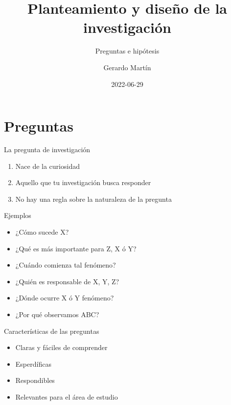 \documentclass[
  11pt,
  ignorenonframetext,
]{beamer}
\title{Planteamiento y diseño de la investigación}
\subtitle{Preguntas e hipótesis}
\author{Gerardo Martín}
\date{2022-06-29}
\begin{document}
\frame{\titlepage}

\hypertarget{preguntas}{%
\section{Preguntas}\label{preguntas}}

\begin{frame}{La pregunta de investigación}
\protect\hypertarget{la-pregunta-de-investigaciuxf3n}{}
\begin{enumerate}
\item
  Nace de la curiosidad
\item
  Aquello que tu investigación busca responder
\item
  No hay una regla sobre la naturaleza de la pregunta
\end{enumerate}
\end{frame}

\begin{frame}{Ejemplos}
\protect\hypertarget{ejemplos}{}
\begin{itemize}
\item
  ¿Cómo sucede X?
\item
  ¿Qué es más importante para Z, X ó Y?
\item
  ¿Cuándo comienza tal fenómeno?
\item
  ¿Quién es responsable de X, Y, Z?
\item
  ¿Dónde ocurre X ó Y fenómeno?
\item
  ¿Por qué observamos ABC?
\end{itemize}
\end{frame}

\begin{frame}{Características de las preguntas}
\protect\hypertarget{caracteruxedsticas-de-las-preguntas}{}
\begin{itemize}
\item
  Claras y fáciles de comprender
\item
  Esperdíficas
\item
  Respondibles
\item
  Relevantes para el área de estudio
\end{itemize}
\end{frame}
\end{document}
